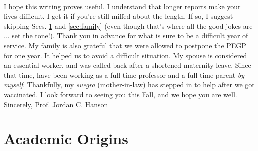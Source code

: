 \documentclass[../../main.tex]{subfiles}
\begin{document}
\\
\vspace{0.15cm}
I hope this writing proves useful. I understand that longer reports make your lives difficult.  I get it if you're still miffed about the length.  If so, I suggest skipping Secs. \ref{sec:origin} and \ref{sec:family} (even though that's where all the good jokes are ... set the tone!).  Thank you in advance for what is sure to be a difficult year of service.  My family is also grateful that we were allowed to postpone the PEGP for one year.  It helped us to avoid a difficult situation.  My spouse is considered an essential worker, and was called back after a shortened maternity leave.  Since that time, have been working as a full-time professor and a full-time parent \textit{by myself}.  Thankfully, my \textit{suegra} (mother-in-law) has stepped in to help after we got vaccinated.  I look forward to seeing you this Fall, and we hope you are well.
\\
\vspace{0.15cm}
Sincerely,
Prof. Jordan C. Hanson

\section{Academic Origins}
\label{sec:origin}
\end{document}

